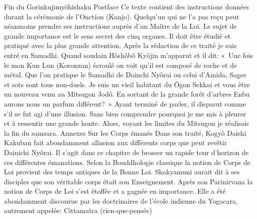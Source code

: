 Fin du Gorinkujimyôhishaku
Postface
Ce texte contient des instructions données durant la cérémonie de l’Onction (Kanjo). Quelqu’un qui ne l’a pas reçu peut néanmoins prendre ses instructions auprès d’un Maître de la Loi. Le sujet de grande importance est le sens secret des cinq organes. Il doit être étudié et pratiqué avec la plus grande attention.
Après la rédaction de ce traité je suis entré en Samadhi. Quand soudain Hôshôbô Kyôjin m'apparut et il dit:
« Une fois le mon Kun Lun (Koronzan) écroulé on voit qu'il est composé de roche et de métal. Que l’on pratique le Samadhi de Dainchi Nyôrai ou celui d’Amida, Sages et sots sont tous non-duels. Je suis un vieil habitant du Ôgon Sekkai et vous être un nouveau venu au Mitsugon Jodô. En sortant de la grande forêt d'arbres Enbu aurons nous un parfum différent? »
Ayant terminé de parler,  il disparut comme s'il se fut agi d'une illusion. Sans bien comprendre pourquoi je me mis à pleurer et à ressentir une grande honte. Alors, voyant les limites du Mitsugon je réalisais la fin du samsara.
Annexes
Sur les Corps émanés
Dans son traité, Kogyô Daishi Kakuban fait abondamment allusion aux différents corps que peut revêtir Dainichi Nyôrai. Il s’agit dans ce chapitre de brosser un rapide tour d’horizon de ces différentes émanations. 
Selon la Bouddhologie classique la notion de Corps de Loi provient des temps antiques de la Bonne Loi. Shakyamuni aurait dit à ses disciples que son véritable corps était son Enseignement. Après son Parinirvana la notion de Corps de Loi s’est étoffée et a gagnée en importance. Elle a été abondamment discourue par les doctrinaires de l’école indienne du Yogacara, autrement appelée: Cittamatra (rien-que-pensée)


